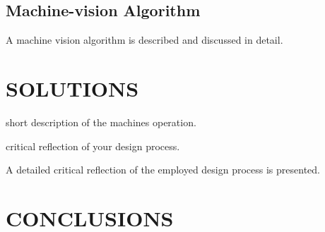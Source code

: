 \documentclass[a4paper, 10pt]{IEEEconf}
\begin{document}
\subsection{Machine-vision Algorithm}

A machine vision algorithm is described and discussed in detail.


\section{SOLUTIONS}

short description of the machines operation.


critical reflection of your design process.

A detailed critical reflection of the employed design process is presented.



\section{CONCLUSIONS}

%
%
\end{document}
